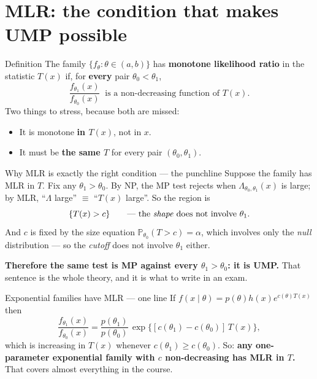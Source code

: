 \documentclass[11pt]{article}
\newcommand{\Prob}{\mathbb{P}}
\begin{document}
\section{MLR: the condition that makes UMP possible}

\begin{idea}{Definition}
The family $\{f_\theta:\theta\in(a,b)\}$ has \textbf{monotone likelihood ratio} in the
statistic $T(x)$ if, for \textbf{every} pair $\theta_0<\theta_1$,
\[
\frac{f_{\theta_1}(x)}{f_{\theta_0}(x)}\ \text{ is a non-decreasing function of } T(x).
\]
Two things to stress, because both are missed:
\begin{itemize}
\item It is monotone \textbf{in $T(x)$}, not in $x$.
\item It must be \textbf{the same $T$} for every pair $(\theta_0,\theta_1)$.
\end{itemize}
\end{idea}

\begin{idea}{Why MLR is exactly the right condition --- the punchline}
Suppose the family has MLR in $T$. Fix any $\theta_1>\theta_0$. By NP, the MP test rejects
when $\Lambda_{\theta_0,\theta_1}(x)$ is large; by MLR, ``$\Lambda$ large'' $\equiv$
``$T(x)$ large''. So the region is
\[
\{T(x)>c\}\qquad\text{--- the \emph{shape} does not involve }\theta_1 .
\]
And $c$ is fixed by the size equation $\Prob_{\theta_0}(T>c)=\alpha$, which involves only the
\emph{null} distribution --- so the \emph{cutoff} does not involve $\theta_1$ either.

\textbf{Therefore the same test is MP against every $\theta_1>\theta_0$: it is UMP.}
That sentence is the whole theory, and it is what to write in an exam.
\end{idea}

\begin{idea}{Exponential families have MLR --- one line}
If $f(x\mid\theta)=p(\theta)h(x)e^{c(\theta)T(x)}$ then
\[
\frac{f_{\theta_1}(x)}{f_{\theta_0}(x)}=\frac{p(\theta_1)}{p(\theta_0)}\,
\exp\big\{[c(\theta_1)-c(\theta_0)]\,T(x)\big\},
\]
which is increasing in $T(x)$ whenever $c(\theta_1)\ge c(\theta_0)$. So:
\textbf{any one-parameter exponential family with $c$ non-decreasing has MLR in $T$.}
That covers almost everything in the course.
\end{idea}
\end{document}
